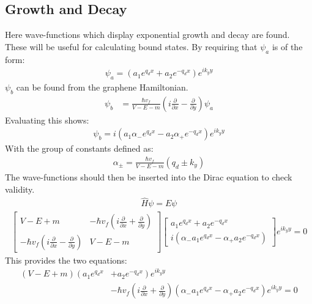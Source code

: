 			\subsection{Growth and Decay}
			\label{Wave-functions - Growth and Decay}
				Here wave-functions which display exponential growth and decay are found. These will be useful for calculating bound states. By requiring that $\psi_{a}$ is of the form:
				\begin{align}
					\psi_{a}=\left(a_{1}e^{q_{d}x}+a_{2}e^{-q_{d}x}\right)e^{ik_{y}y}
				\end{align}
				$\psi_{b}$ can be found from the graphene Hamiltonian.
				\begin{align}
					\psi_{b}&=\frac{\hbar v_{f}}{V-E-m}\left(i\frac{\partial}{\partial x}-\frac{\partial}{\partial y}\right)\psi_{a}
				\end{align}
				Evaluating this shows:
				\begin{align}
					\psi_{b}=i\left(a_{1}\alpha_{-}e^{q_{d}x}-a_{2}\alpha_{+}e^{-q_{d}x}\right)e^{ik_{y}y}
				\end{align}
				With the group of constants defined as:
				\begin{align}
					\alpha_{\pm}=\frac{\hbar v_{f}}{V-E-m}\left(q_{d}\pm k_{y}\right)
				\end{align}
				The wave-functions should then be inserted into the Dirac equation to check validity.
				\begin{align}
					\hat{H}\psi=E\psi
				\end{align}
				\begin{align}
					\left[\begin{array}{ccc}
						V-E+m&-\hbar v_{f}\left(i\frac{\partial}{\partial x}+\frac{\partial}{\partial y}\right)\\
						-\hbar v_{f}\left(i\frac{\partial}{\partial x}-\frac{\partial}{\partial y}\right)&V-E-m
					\end{array}\right]
					\left[\begin{array}{ccc}
						a_{1}e^{q_{d}x}+a_{2}e^{-q_{d}x}\\
						i\left(\alpha_{-}a_{1}e^{q_{d}x}-\alpha_{+}a_{2}e^{-q_{d}x}\right)
					\end{array}\right]e^{ik_{y}y}
					=0
				\end{align}
				This provides the two equations:
				\begin{align}
					\left(V-E+m\right)\left(a_{1}e^{q_{d}x}\right. &+ \left.a_{2}e^{-q_{d}x}\right)e^{ik_{y}y}\\
					&-\hbar v_{f}\left(i\frac{\partial}{\partial x}+\frac{\partial}{\partial y}\right)\left(\alpha_{-}a_{1}e^{q_{d}x}-\alpha_{+}a_{2}e^{-q_{d}x}\right)e^{ik_{y}y}=0
				\end{align}
